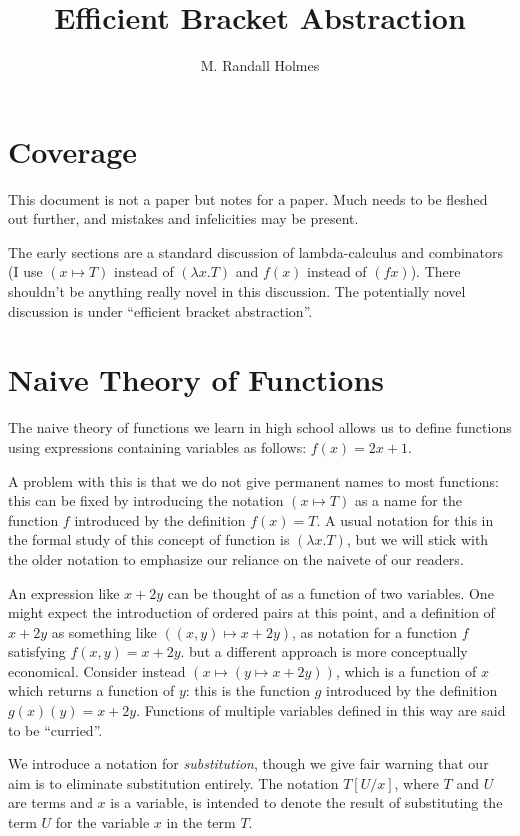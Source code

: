 \documentclass{article}
\title{Efficient Bracket Abstraction}
\author{M. Randall Holmes}
\begin{document}
\maketitle

\tableofcontents

\section{Coverage}

This document is not a paper but notes for a paper.  Much needs to be
fleshed out further, and mistakes and infelicities may be present.

The early sections are a standard discussion of lambda-calculus and
combinators (I use $(x \mapsto T)$ instead of $(\lambda x.T)$ and
$f(x)$ instead of $(fx)$).  There shouldn't be anything really novel
in this discussion.  The potentially novel discussion is under
``efficient bracket abstraction''.

\section{Naive Theory of Functions}

The naive theory of functions we learn in high school allows us to
define functions using expressions containing variables as follows:
$f(x) = 2x+1$.

A problem with this is that we do not give permanent names to most
functions: this can be fixed by introducing the notation $(x\mapsto
T)$ as a name for the function $f$ introduced by the definition
$f(x)=T$.  A usual notation for this in the formal study of this
concept of function is $(\lambda x.T)$, but we will stick with the
older notation to emphasize our reliance on the naivete of our
readers.

An expression like $x+2y$ can be thought of as a function of two
variables.  One might expect the introduction of ordered pairs at this
point, and a definition of $x+2y$ as something like $((x,y)\mapsto
x+2y)$, as notation for a function $f$ satisfying $f(x,y) = x+2y$.
but a different approach is more conceptually economical.  Consider
instead $(x \mapsto (y \mapsto x+2y))$, which is a function of $x$
which returns a function of $y$: this is the function $g$ introduced
by the definition $g(x)(y)=x+2y$.  Functions of multiple variables
defined in this way are said to be ``curried''.

We introduce a notation for {\em substitution\/}, though we give fair
warning that our aim is to eliminate substitution entirely.  The
notation $T[U/x]$, where $T$ and $U$ are terms and $x$ is a variable,
is intended to denote the result of substituting the term $U$ for the
variable $x$ in the term $T$.
\end{document}
